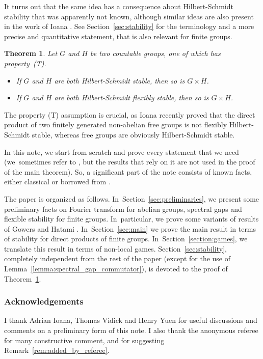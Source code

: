 \documentclass[JEP,XML,SOM,Unicode,published]{cedram}
\theoremstyle{plain}
\newtheorem{theorem}{Theorem}[section]
\theoremstyle{definition}
\begin{document}
It turns out that the same idea has a consequence about Hilbert-Schmidt stability that was apparently not known, although similar ideas are also present in the work of Ioana \cite{MR4134896}. See Section~\ref{sec:stability} for the terminology and a more precise and quantitative statement, that is also relevant for finite groups.

\begin{theorem}\label{thm:stability_direct_product_simple} Let $G$ and $H$ be two countable groups, one of which has property~(T).\enlargethispage{.5\baselineskip}

\begin{itemize}
\item
If $G$ and $H$ are both Hilbert-Schmidt stable, then so is $G\times H$.

\item
If $G$ and $H$ are both Hilbert-Schmidt flexibly stable, then so is $G\times H$.
\end{itemize}
\end{theorem}

The property (T) assumption is crucial, as Ioana recently proved \cite{Ioana2} that the direct product of two finitely generated non-abelian free groups is not flexibly Hilbert-Schmidt stable, whereas free groups are obviously Hilbert-Schmidt stable.

In this note, we start from scratch and prove every statement that we need (we~sometimes refer to \cite{orthonormalisation}, but the results that rely on it are not used in the proof of the main theorem). So, a significant part of the note consists of known facts, either classical or borrowed from \cite{MIPRE}.

The paper is organized as follows. In~Section~\ref{sec:preliminaries}, we present some preliminary facts on Fourier transform for abelian groups, spectral gaps and flexible stability for finite groups. In~particular, we prove some variants of results of Gowers and Hatami \cite{MR3733361}. In~Section~\ref{sec:main} we prove the main result in terms of stability for direct products of finite groups. In~Section~\ref{section:games}, we translate this result in terms of non-local games. Section~\ref{sec:stability}, completely independent from the rest of the paper (except for the use of Lemma~\ref{lemma:spectral_gap_commutator}), is devoted to the proof of Theorem~\ref{thm:stability_direct_product_simple}.

\subsubsection*{Acknowledgements} I thank Adrian Ioana, Thomas Vidick and Henry Yuen for useful discussions and comments on a preliminary form of this note. I also thank the anonymous referee for many constructive comment, and for suggesting Remark~\ref{rem:added_by_referee}.
\end{document}
